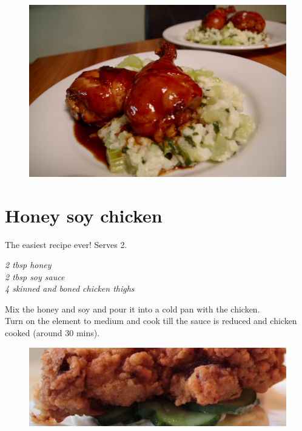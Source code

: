 \documentclass{tufte-book}
\begin{document}

\begin{figure}[h]
  \includegraphics[width=\linewidth]{stickychicken.png}
\end{figure}

\section{Honey soy chicken}

The easiest recipe ever! Serves 2.

\smallskip
\emph{2 tbsp honey
\\2 tbsp soy sauce
\\4 skinned and boned chicken thighs}

\smallskip
Mix the honey and soy and pour it into a cold pan with the chicken.
\\Turn on the element to medium and cook till the sauce is reduced and chicken cooked (around 30 mins).

\newpage

\begin{figure}[h]
  \includegraphics[width=\linewidth]{friedchicken.jpg}
\end{figure}
\end{document}
